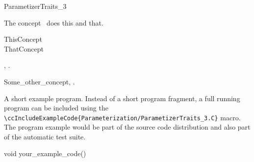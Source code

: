 

\begin{ccRefConcept}{ParametizerTraits_3}


\ccDefinition
  
The concept \ccRefName\ does this and that.

\ccGeneralizes

ThisConcept \\
ThatConcept

\ccTypes


\ccCreation
{}  %


\ccOperations


\ccHasModels

,
.

\ccSeeAlso

Some\_other\_concept,
.

\ccExample

A short example program.
Instead of a short program fragment, a full running program can be
included using the 
\verb|\ccIncludeExampleCode{Parameterization/ParametizerTraits_3.C}| 
macro. The program example would be part of the source code distribution and
also part of the automatic test suite.

\begin{ccExampleCode}
void your_example_code() {
}
\end{ccExampleCode}


\end{ccRefConcept}


